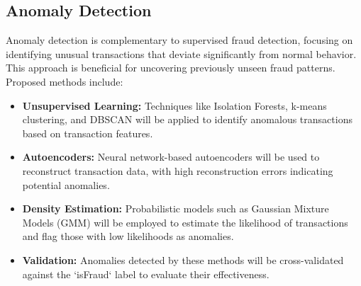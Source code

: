 \documentclass[12pt,a4paper, hidelinks]{article}
\begin{document}
\subsection{Anomaly Detection}
Anomaly detection is complementary to supervised fraud detection, focusing on identifying unusual transactions that deviate significantly from normal behavior. This approach is beneficial for uncovering previously unseen fraud patterns. Proposed methods include:
\begin{itemize}
    \item \textbf{Unsupervised Learning:} Techniques like Isolation Forests, k-means clustering, and DBSCAN will be applied to identify anomalous transactions based on transaction features. 
    \item \textbf{Autoencoders:} Neural network-based autoencoders will be used to reconstruct transaction data, with high reconstruction errors indicating potential anomalies.
    \item \textbf{Density Estimation:} Probabilistic models such as Gaussian Mixture Models (GMM) will be employed to estimate the likelihood of transactions and flag those with low likelihoods as anomalies.
    \item \textbf{Validation:} Anomalies detected by these methods will be cross-validated against the `isFraud` label to evaluate their effectiveness.
\end{itemize}

\end{document}
